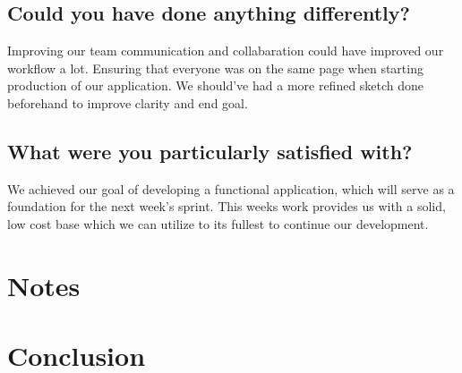 \documentclass[12pt]{article}
\begin{document}
\subsection{Could you have done anything differently?}
Improving our team communication and collabaration could have improved our workflow a lot. Ensuring that everyone was on the 
same page when starting production of our application. We should've had a more refined sketch done beforehand to improve 
clarity and end goal.

\subsection{What were you particularly satisfied with?}
We achieved our goal of developing a functional application, which will serve as a foundation for the next week's sprint. 
This weeks work provides us with a solid, low cost base which we can utilize to its fullest to continue our development.

\section{Notes}

\section{Conclusion}

\printbibliography
\end{document}
